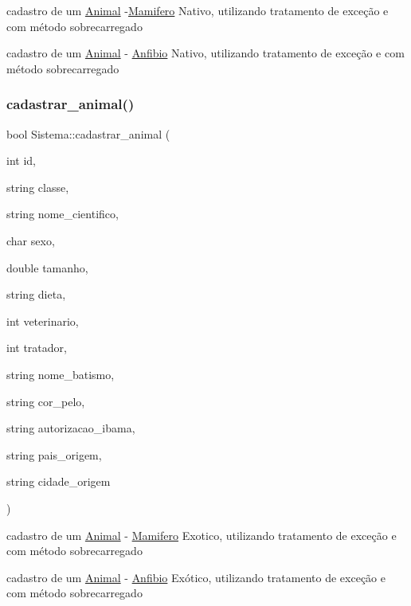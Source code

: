 cadastro de um \mbox{\hyperlink{class_animal}{Animal}} -\/\mbox{\hyperlink{class_mamifero}{Mamifero}} Nativo, utilizando tratamento de exceção e com método sobrecarregado 

cadastro de um \mbox{\hyperlink{class_animal}{Animal}} -\/ \mbox{\hyperlink{class_anfibio}{Anfibio}} Nativo, utilizando tratamento de exceção e com método sobrecarregado \mbox{\label{class_sistema_a5bc6a9264b55170329115d8fa97a5d8f}} 
\subsubsection{\texorpdfstring{cadastrar\_animal()}{cadastrar\_animal()}\hspace{0.1cm}{\footnotesize\ttfamily [9/12]}}
{\footnotesize\ttfamily bool Sistema\+::cadastrar\+\_\+animal (\begin{DoxyParamCaption}\item[{int}]{id,  }\item[{string}]{classe,  }\item[{string}]{nome\+\_\+cientifico,  }\item[{char}]{sexo,  }\item[{double}]{tamanho,  }\item[{string}]{dieta,  }\item[{int}]{veterinario,  }\item[{int}]{tratador,  }\item[{string}]{nome\+\_\+batismo,  }\item[{string}]{cor\+\_\+pelo,  }\item[{string}]{autorizacao\+\_\+ibama,  }\item[{string}]{pais\+\_\+origem,  }\item[{string}]{cidade\+\_\+origem }\end{DoxyParamCaption})}



cadastro de um \mbox{\hyperlink{class_animal}{Animal}} -\/ \mbox{\hyperlink{class_mamifero}{Mamifero}} Exotico, utilizando tratamento de exceção e com método sobrecarregado 

cadastro de um \mbox{\hyperlink{class_animal}{Animal}} -\/ \mbox{\hyperlink{class_anfibio}{Anfibio}} Exótico, utilizando tratamento de exceção e com método sobrecarregado \mbox{\label{class_sistema_ac30d90899aab0832645814e96cb8de61}} 
